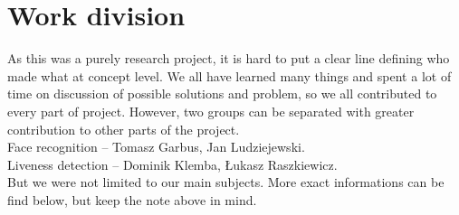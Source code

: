 \chapter{Work division}
    As this was a purely research project, it is hard to
    put a clear line defining who made what at concept level.
    We all have learned many things and spent a lot of time
    on discussion of possible solutions and problem,
    so we all contributed to every part of project.
    However, two groups can be separated
    with greater contribution to other parts of the project.\\
    Face recognition -- Tomasz Garbus, Jan Ludziejewski.\\
    Liveness detection -- Dominik Klemba, Łukasz Raszkiewicz.\\
    But we were not limited to our main subjects.
    More exact informations can be find below, but keep the note above in mind.


